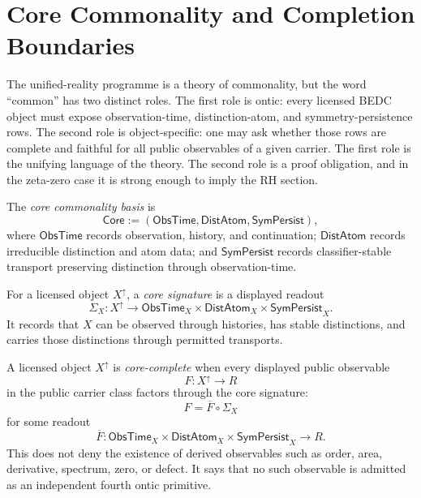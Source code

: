 \section{Core Commonality and Completion Boundaries}
\label{sec:unified-reality-core-commonality-completion-boundary}

The unified-reality programme is a theory of commonality, but the word
``common'' has two distinct roles.  The first role is ontic: every
licensed BEDC object must expose observation-time, distinction-atom, and
symmetry-persistence rows.  The second role is object-specific:
one may ask whether those rows are complete and faithful for all public
observables of a given carrier.  The first role is the unifying
language of the theory.  The second role is a proof obligation, and in
the zeta-zero case it is strong enough to imply the RH section.

\begin{definition}
\label{def:unified-reality-core-commonality-basis}
The \emph{core commonality basis} is
$$
\mathsf{Core}
:=
(\mathsf{ObsTime},\mathsf{DistAtom},\mathsf{SymPersist}),
$$
where $\mathsf{ObsTime}$ records observation, history, and continuation;
$\mathsf{DistAtom}$ records irreducible distinction and atom data; and
$\mathsf{SymPersist}$ records classifier-stable transport preserving
distinction through observation-time.
\end{definition}

\begin{definition}
\label{def:unified-reality-core-signature-licensed-object}
For a licensed object $X^{\uparrow}$, a \emph{core signature} is a
displayed readout
$$
\Sigma_X:
X^{\uparrow}
\to
\mathsf{ObsTime}_X
\times
\mathsf{DistAtom}_X
\times
\mathsf{SymPersist}_X.
$$
It records that $X$ can be observed through histories, has stable
distinctions, and carries those distinctions through permitted
transports.
\end{definition}

\begin{definition}
\label{def:unified-reality-core-completeness}
A licensed object $X^{\uparrow}$ is \emph{core-complete} when every
displayed public observable
$$
F:X^{\uparrow}\to R
$$
in the public carrier class factors through the core signature:
$$
F=\overline F\circ\Sigma_X
$$
for some readout
$$
\overline F:
\mathsf{ObsTime}_X
\times
\mathsf{DistAtom}_X
\times
\mathsf{SymPersist}_X
\to R.
$$
This does not deny the existence of derived observables such as order,
area, derivative, spectrum, zero, or defect.  It says that no such
observable is admitted as an independent fourth ontic primitive.
\end{definition}

